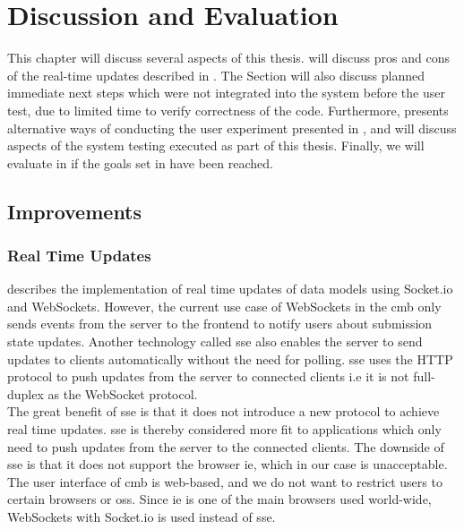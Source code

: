 \chapter{Discussion and Evaluation}
\label{ch:evaluation}
This chapter will discuss several aspects of this thesis.  will discuss pros and cons of the real-time updates described in . The Section will also discuss planned immediate next steps which were not integrated into the system before the user test, due to limited time to verify correctness of the code. Furthermore,  presents alternative ways of conducting the user experiment presented in , and  will discuss aspects of the system testing executed as part of this thesis. Finally, we will evaluate in  if the goals set in  have been reached.

\section{Improvements}
\label{sec:eval-tech}

\subsection{Real Time Updates}
 describes the implementation of real time updates of data models using Socket.io and WebSockets. However, the current use case of WebSockets in the \gls{cmb} only sends events from the server to the frontend to notify users about submission state updates. Another technology called \gls{sse} \cite{hickson2009} also enables the server to send updates to clients automatically without the need for polling. \gls{sse} uses the HTTP protocol to push updates from the server to connected clients i.e it is not full-duplex as the WebSocket protocol.  \\

The great benefit of \gls{sse} is that it does not introduce a new protocol to achieve real time updates. \gls{sse} is thereby considered more fit to applications which only need to push updates from the server to the connected clients. The downside of \gls{sse} is that it does not support the browser \gls{ie}, which in our case is unacceptable. The user interface of \gls{cmb} is web-based, and we do not want to restrict users to certain browsers or \glspl{os}. Since \gls{ie} is one of the main browsers used world-wide, WebSockets with Socket.io is used instead of \gls{sse}.  \\

